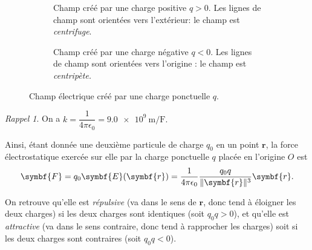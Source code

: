 \documentclass{article}
\newcommand{\vv}[1]{\symbf{#1}}
\DeclarePairedDelimiter{\norm}{\lVert}{\rVert}
\theoremstyle{definition}
\theoremstyle{remark}
\newtheorem*{rap}{Rappel}
\begin{document}
\begin{figure}[h]
	\centering
	\begin{subfigure}[b]{0.44\textwidth}
		\caption{Champ créé par une charge positive $q>0$. Les lignes de champ sont orientées vers l'extérieur: le champ est \textit{centrifuge}.}
	\end{subfigure}\qquad
	\begin{subfigure}[b]{0.44\textwidth}
		\caption{Champ créé par une charge négative $q<0$. Les lignes de champ sont orientées vers l'origine : le champ est \textit{centripète.}}
	\end{subfigure}
    \caption{Champ électrique créé par une charge ponctuelle $q$.}
\end{figure}

\begin{rap}
	On a $k=\dfrac{1}{4\pi\epsilon_0}=\SI{9.0e9}{\meter\per\farad}.$
\end{rap}

Ainsi, étant donnée une deuxième particule de charge $q_0$ en un point $\vv{r}$, la force électrostatique exercée sur elle par la charge ponctuelle $q$ placée en l'origine $O$ est
	\[ 
	\vv{F} = q_0\vv{E}(\vv{r}) = \frac{1}{4\pi\epsilon_0}\frac{q_0q}{\norm{\vv{r}}^3}\vv{r}.
	 \]

On retrouve qu'elle est \textit{répulsive} (va dans le sens de $\vv{r}$, donc tend à éloigner les deux charges)  si les deux charges sont identiques (soit $q_0q>0$), et qu'elle est \textit{attractive} (va dans le sens contraire, donc tend à rapprocher les charges) soit si les deux charges sont contraires (soit $q_0q<0$).
\end{document}
